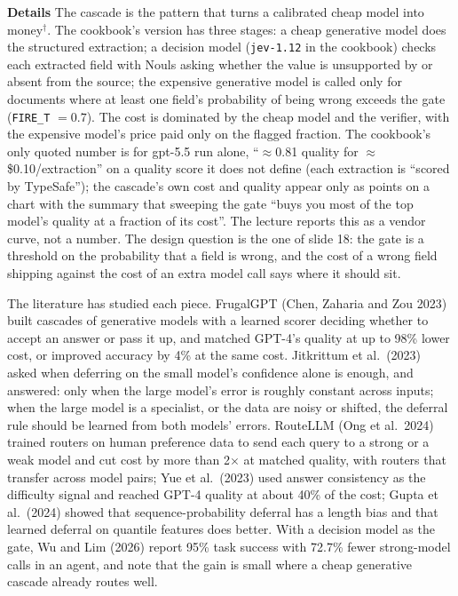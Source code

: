 \documentclass[11pt,letterpaper]{article}
\newcommand{\para}[1]{\medskip\noindent\textbf{#1}\quad}
\begin{document}
\para{Details} The cascade is the pattern that turns a calibrated cheap model into money$^\dagger$. The cookbook's version has three stages: a cheap generative model does the structured extraction; a decision model (\texttt{jev-1.12} in the cookbook) checks each extracted field with Nouls asking whether the value is unsupported by or absent from the source; the expensive generative model is called only for documents where at least one field's probability of being wrong exceeds the gate (\texttt{FIRE\_T} $=0.7$). The cost is dominated by the cheap model and the verifier, with the expensive model's price paid only on the flagged fraction. The cookbook's only quoted number is for gpt-5.5 run alone, ``$\approx$0.81 quality for $\approx$\$0.10/extraction'' on a quality score it does not define (each extraction is ``scored by TypeSafe''); the cascade's own cost and quality appear only as points on a chart with the summary that sweeping the gate ``buys you most of the top model's quality at a fraction of its cost''. The lecture reports this as a vendor curve, not a number. The design question is the one of slide 18: the gate is a threshold on the probability that a field is wrong, and the cost of a wrong field shipping against the cost of an extra model call says where it should sit.

The literature has studied each piece. FrugalGPT (Chen, Zaharia and Zou 2023) built cascades of generative models with a learned scorer deciding whether to accept an answer or pass it up, and matched GPT-4's quality at up to 98\% lower cost, or improved accuracy by 4\% at the same cost. Jitkrittum et al.\ (2023) asked when deferring on the small model's confidence alone is enough, and answered: only when the large model's error is roughly constant across inputs; when the large model is a specialist, or the data are noisy or shifted, the deferral rule should be learned from both models' errors. RouteLLM (Ong et al.\ 2024) trained routers on human preference data to send each query to a strong or a weak model and cut cost by more than 2$\times$ at matched quality, with routers that transfer across model pairs; Yue et al.\ (2023) used answer consistency as the difficulty signal and reached GPT-4 quality at about 40\% of the cost; Gupta et al.\ (2024) showed that sequence-probability deferral has a length bias and that learned deferral on quantile features does better. With a decision model as the gate, Wu and Lim (2026) report 95\% task success with 72.7\% fewer strong-model calls in an agent, and note that the gain is small where a cheap generative cascade already routes well.
\end{document}

